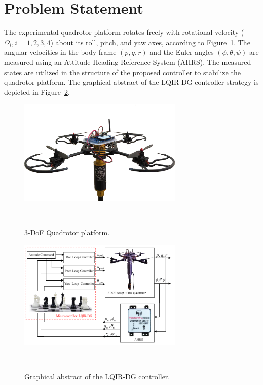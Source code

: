 \documentclass[3p]{elsarticle}
\begin{document}

\section{Problem Statement}\label{sec:problem}
\noindent The experimental quadrotor platform rotates freely with rotational velocity ($\Omega_i, i = 1, 2, 3, 4$) about its roll, pitch, and yaw axes, according to Figure~\ref{fig:quadrotor}.
The angular velocities in the body frame $(p, q, r)$ and the Euler angles $(\phi, \theta, \psi)$ are measured using an Attitude Heading Reference System (AHRS).
The measured states are utilized in the structure of the proposed controller to stabilize the quadrotor platform.
The graphical abstract of the LQIR-DG controller strategy is depicted in Figure~\ref{fig:blockdiagram}.
\begin{figure}[H]
    \centering
    \includegraphics[width=0.7\textwidth]{../Figure/3DOFQuad.png}
    \caption{3-DoF Quadrotor platform.}
~\label{fig:quadrotor}
 \end{figure}
 
 \begin{figure}[H]
    \centering
    \includegraphics[width=0.7\textwidth]{../Figure/schematic.pdf}
    \caption{Graphical abstract of the LQIR-DG controller.}
~\label{fig:blockdiagram}
 \end{figure}
\end{document}
